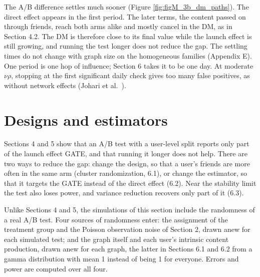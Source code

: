 \documentclass[final,5p,times,twocolumn,number]{elsarticle}
\begin{document}
The A/B difference settles much sooner (Figure \ref{fig:figM_3b_dm_paths}). The direct effect appears in the first period. The later terms, the content passed on through friends, reach both arms alike and mostly cancel in the DM, as in Section 4.2. The DM is therefore close to its final value while the launch effect is still growing, and running the test longer does not reduce the gap. The settling times do not change with graph size on the homogeneous families (Appendix E). One period is one hop of influence; Section 6 takes it to be one day. At moderate $\nu\rho$, stopping at the first significant daily check gives too many false positives, as without network effects (Johari et al.~\cite{r14}).


\section{Designs and estimators}

Sections 4 and 5 show that an A/B test with a user-level split reports only part of the launch effect GATE, and that running it longer does not help. There are two ways to reduce the gap: change the design, so that a user's friends are more often in the same arm (cluster randomization, 6.1), or change the estimator, so that it targets the GATE instead of the direct effect (6.2). Near the stability limit the test also loses power, and variance reduction recovers only part of it (6.3).


Unlike Sections 4 and 5, the simulations of this section include the randomness of a real A/B test. Four sources of randomness enter: the assignment of the treatment group and the Poisson observation noise of Section 2, drawn anew for each simulated test; and the graph itself and each user's intrinsic content production, drawn anew for each graph, the latter in Sections 6.1 and 6.2 from a gamma distribution with mean 1 instead of being 1 for everyone. Errors and power are computed over all four.
\end{document}
